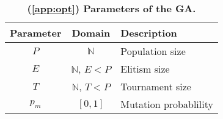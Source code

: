 \begin{table}[h]
\setlength{\tabcolsep}{5pt}
\centering
\captionsetup{justification=centering}
\begin{tabular}{ccl}

\toprule
Parameter	& Domain		& Description
\vspace{-0.3em}\\
\midrule
$P$			& $\mathbb{N}$			& Population size 			\\
$E$			& $\mathbb{N}$, $E<P$ 	& Elitism size 				\\
$T$			& $\mathbb{N}$, $T<P$ 	& Tournament size 			\\
$p_m$		& $[0,1]$				& Mutation probablility		\\
\bottomrule
\end{tabular}
\caption{\textbf{(\textsection \ref{app:opt}) Parameters of the GA.}}
\label{tab:app-ga}
\end{table}

